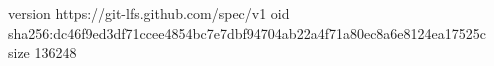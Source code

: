 version https://git-lfs.github.com/spec/v1
oid sha256:dc46f9ed3df71ccee4854bc7e7dbf94704ab22a4f71a80ec8a6e8124ea17525c
size 136248
